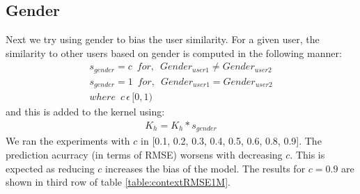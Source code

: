 \documentclass[10 pt,table]{article}  %
\begin{document}
\subsection{Gender}
Next we try using gender to bias the user similarity. For a given user, the similarity to other users based on gender is computed in the following manner:
\begin{align}
s_{gender} = c \,\,\, for,\,\,\, Gender_{user1} \neq Gender_{user2} \\
s_{gender} = 1 \,\,\, for,\,\,\, Gender_{user1} = Gender_{user2} \\
where \,\,\, c \, \epsilon \, [0, 1)
\end{align} \label{eq:simGender}
and this is added to the kernel using:
\begin{align}
K_h = K_h *s_{gender}
\end{align} \label{eq:kernelGender}
We ran the experiments with $c$ in [0.1, 0.2, 0.3, 0.4, 0.5, 0.6, 0.8, 0.9]. The prediction acurracy (in terms of RMSE) worsens with decreasing $c$. This is expected as reducing $c$ increases the bias of the model.
The results for $c = 0.9$ are shown in third row of table \ref{table:contextRMSE1M}.
\end{document}
